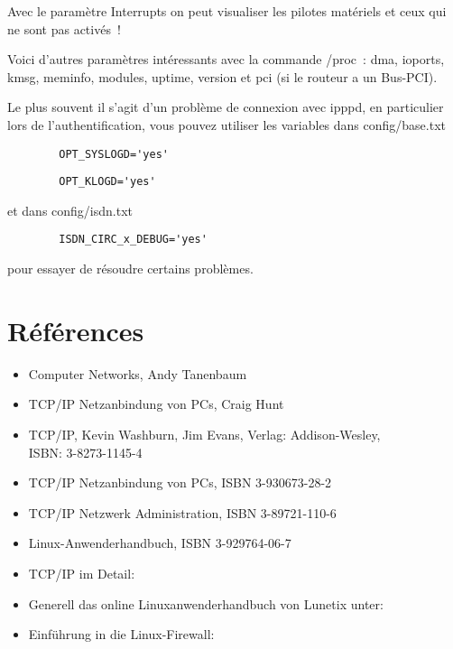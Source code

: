     Avec le paramètre Interrupts on peut visualiser les pilotes
    matériels et ceux qui ne sont pas activés~!

    Voici d'autres paramètres intéressants avec la commande /proc~:
    dma, ioports, kmsg, meminfo, modules, uptime, version et pci
    (si le routeur a un Bus-PCI).

    Le plus souvent il s'agit d'un problème de connexion avec ipppd,
    en particulier lors de l'authentification, vous pouvez utiliser
    les variables dans config/base.txt

\begin{example}
\begin{verbatim}
        OPT_SYSLOGD='yes'
\end{verbatim}
\end{example}

\begin{example}
\begin{verbatim}
        OPT_KLOGD='yes'
\end{verbatim}
\end{example}

    et dans config/isdn.txt

\begin{example}
\begin{verbatim}
        ISDN_CIRC_x_DEBUG='yes'
\end{verbatim}
\end{example}

    pour essayer de résoudre certains problèmes.


    \section{Références}

    \begin{itemize}
    \item Computer Networks, Andy Tanenbaum
    \item TCP/IP Netzanbindung von PCs, Craig Hunt
    \item TCP/IP, Kevin Washburn, Jim Evans, Verlag: Addison-Wesley, \\ISBN: 3-8273-1145-4
    \item TCP/IP Netzanbindung von PCs, ISBN 3-930673-28-2
    \item TCP/IP Netzwerk Administration, ISBN 3-89721-110-6
    \item Linux-Anwenderhandbuch, ISBN 3-929764-06-7
    \item TCP/IP im Detail:\\
    \item Generell das online Linuxanwenderhandbuch von Lunetix unter:\\
    \item Einführung in die Linux-Firewall:
    \end{itemize}


